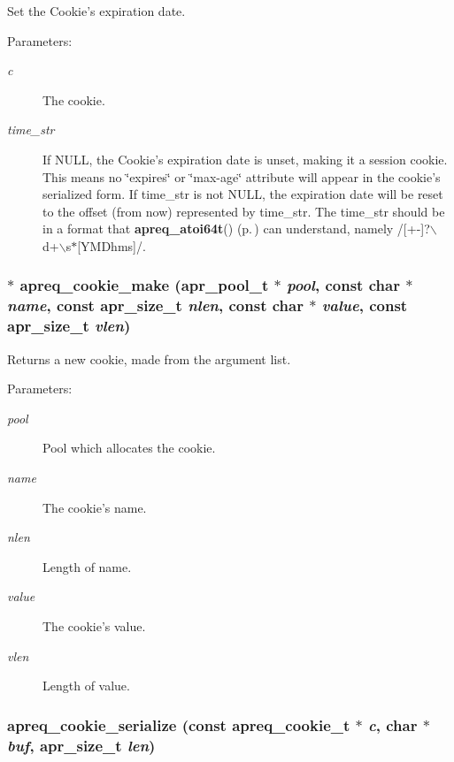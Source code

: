 Set the Cookie's expiration date.\begin{Desc}
\item[Parameters: ]\par
\begin{description}
\item[{\em 
c}]The cookie. \item[{\em 
time\_\-str}]If NULL, the Cookie's expiration date is unset, making it a session cookie. This means no \char`\"{}expires\char`\"{} or \char`\"{}max-age\char`\"{}  attribute will appear in the cookie's serialized form. If time\_\-str is not NULL, the expiration date will be reset to the offset (from now) represented by time\_\-str. The time\_\-str should be in a format that  {\bf apreq\_\-atoi64t}() {\rm (p.\,\pageref{group__Utils_a18})} can understand, namely /[+-]?$\backslash$d+$\backslash$s$\ast$[YMDhms]/. \end{description}
\end{Desc}
\subsubsection{$\ast$ apreq\_\-cookie\_\-make ({\bf apr\_\-pool\_\-t} $\ast$ {\em pool}, const char $\ast$ {\em name}, const {\bf apr\_\-size\_\-t} {\em nlen}, const char $\ast$ {\em value}, const {\bf apr\_\-size\_\-t} {\em vlen})}\label{group__cookies_a5}


Returns a new cookie, made from the argument list.\begin{Desc}
\item[Parameters: ]\par
\begin{description}
\item[{\em 
pool}]Pool which allocates the cookie. \item[{\em 
name}]The cookie's name. \item[{\em 
nlen}]Length of name. \item[{\em 
value}]The cookie's value. \item[{\em 
vlen}]Length of value. \end{description}
\end{Desc}
\subsubsection{ apreq\_\-cookie\_\-serialize (const {\bf apreq\_\-cookie\_\-t} $\ast$ {\em c}, char $\ast$ {\em buf}, {\bf apr\_\-size\_\-t} {\em len})}\label{group__cookies_a8}



